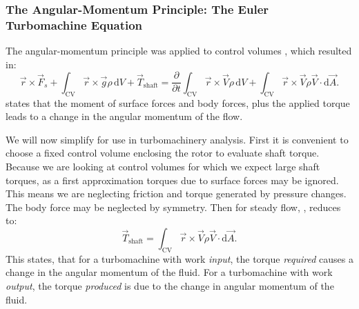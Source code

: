 \subsubsection{The Angular-Momentum Principle: The Euler Turbomachine Equation} \label{sec:eulerturb}
The angular-momentum principle was applied to control volumes , which resulted in:
\begin{equation*}
  \Vec{r} \times \Vec{F}_s + \int_{\mathrm{CV}} \Vec{r} \times \Vec{g} \rho \, \mathrm{d}V + \Vec{T}_{\text{shaft}} = \frac{\partial }{\partial t} \int_{\mathrm{CV}} \Vec{r} \times \Vec{V} \rho \, \mathrm{d}V + \int_{\mathrm{CV}} \Vec{r} \times \Vec{V} \rho \Vec{V} \cdot \mathrm{d}\Vec{A}
.\end{equation*}
 states that the moment of surface forces and body forces, plus the applied torque leads to a change in the angular momentum of the flow.

We will now simplify  for use in turbomachinery analysis.
First it is convenient to choose a fixed control volume enclosing the rotor to evaluate shaft torque.
Because we are looking at control volumes for which we expect large shaft torques, as a first approximation torques due to surface forces may be ignored.
This means we are neglecting friction and torque generated by pressure changes.
The body force may be neglected by symmetry.
Then for steady flow, , reduces to:
\begin{equation} \label{eq:angmomprinturb}
  \Vec{T}_{\text{shaft}} = \int_{\mathrm{CV}} \Vec{r} \times \Vec{V} \rho \Vec{V} \cdot \mathrm{d}\Vec{A}
.\end{equation}
This states, that for a turbomachine with work \textit{input}, the torque \textit{required} causes a change in the angular momentum of the fluid.
For a turbomachine with work \textit{output}, the torque \textit{produced} is due to the change in angular momentum of the fluid.

